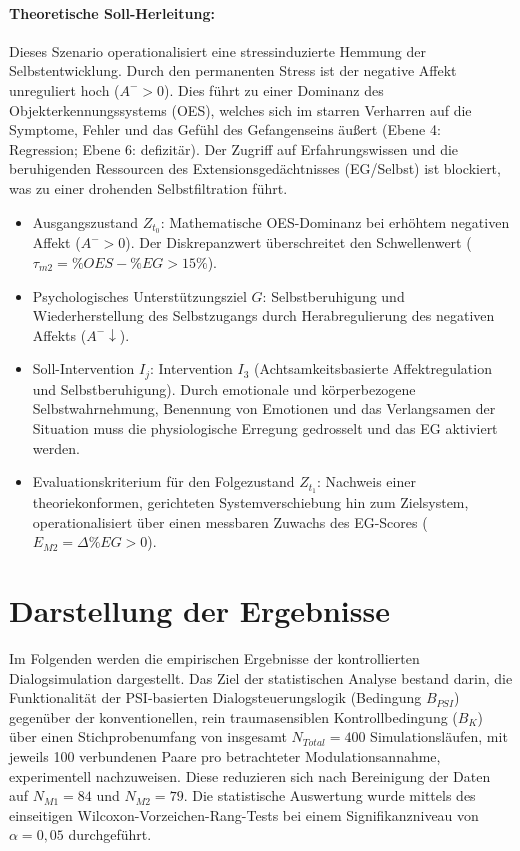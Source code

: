 \paragraph{Theoretische Soll-Herleitung:} 
Dieses Szenario operationalisiert eine stressinduzierte Hemmung der Selbstentwicklung. Durch den permanenten Stress ist der negative Affekt unreguliert hoch ($A^- > 0$). Dies führt zu einer Dominanz des Objekterkennungssystems (OES), welches sich im starren Verharren auf die Symptome, Fehler und das Gefühl des Gefangenseins äußert (Ebene 4: Regression; Ebene 6: defizitär). Der Zugriff auf Erfahrungswissen und die beruhigenden Ressourcen des Extensionsgedächtnisses (EG/Selbst) ist blockiert, was zu einer drohenden Selbstfiltration führt.
\begin{itemize}
    \item Ausgangszustand $Z_{t_0}$: Mathematische OES-Dominanz bei erhöhtem negativen Affekt ($A^- > 0$). Der Diskrepanzwert überschreitet den Schwellenwert ($\tau_{m2} = \%OES - \%EG > 15\%$).
    \item Psychologisches Unterstützungsziel $G$: Selbstberuhigung und Wiederherstellung des Selbstzugangs durch Herabregulierung des negativen Affekts ($A^- \downarrow$).
    \item Soll-Intervention $I_j$: Intervention $I_3$ (Achtsamkeitsbasierte Affektregulation und Selbstberuhigung). Durch emotionale und körperbezogene Selbstwahrnehmung, Benennung von Emotionen und das Verlangsamen der Situation muss die physiologische Erregung gedrosselt und das EG aktiviert werden.
    \item Evaluationskriterium für den Folgezustand $Z_{t_1}$: Nachweis einer theoriekonformen, gerichteten Systemverschiebung hin zum Zielsystem, operationalisiert über einen messbaren Zuwachs des EG-Scores ($E_{M2} = \Delta\%EG > 0$).
\end{itemize}

\section{Darstellung der Ergebnisse}

Im Folgenden werden die empirischen Ergebnisse der kontrollierten Dialogsimulation dargestellt. Das Ziel der statistischen Analyse bestand darin, die Funktionalität der PSI-basierten Dialogsteuerungslogik (Bedingung $B_{PSI}$) gegenüber der konventionellen, rein traumasensiblen Kontrollbedingung ($B_K$) über einen Stichprobenumfang von insgesamt $N_{Total} = 400$ Simulationsläufen, mit jeweils 100 verbundenen Paare pro betrachteter Modulationsannahme, experimentell nachzuweisen. Diese reduzieren sich nach Bereinigung der Daten auf $N_{M1} = 84$ und $N_{M2} = 79$. 
Die statistische Auswertung wurde mittels des einseitigen Wilcoxon-Vorzeichen-Rang-Tests bei einem Signifikanzniveau von $\alpha = 0{,}05$ durchgeführt.

